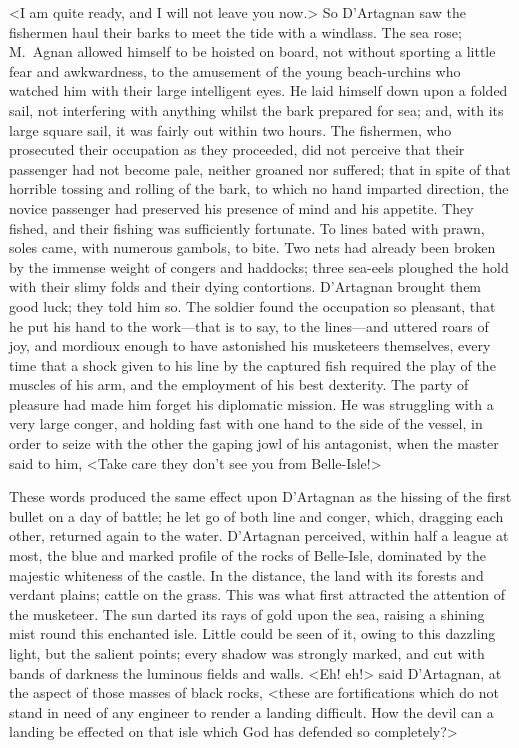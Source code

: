 <I am quite ready, and I will not leave you now.> So D'Artagnan saw the fishermen haul their barks to meet the tide with a windlass. The sea rose; M.~Agnan allowed himself to be hoisted on board, not without sporting a little fear and awkwardness, to the amusement of the young beach-urchins who watched him with their large intelligent eyes. He laid himself down upon a folded sail, not interfering with anything whilst the bark prepared for sea; and, with its large square sail, it was fairly out within two hours. The fishermen, who prosecuted their occupation as they proceeded, did not perceive that their passenger had not become pale, neither groaned nor suffered; that in spite of that horrible tossing and rolling of the bark, to which no hand imparted direction, the novice passenger had preserved his presence of mind and his appetite. They fished, and their fishing was sufficiently fortunate. To lines bated with prawn, soles came, with numerous gambols, to bite. Two nets had already been broken by the immense weight of congers and haddocks; three sea-eels ploughed the hold with their slimy folds and their dying contortions. D'Artagnan brought them good luck; they told him so. The soldier found the occupation so pleasant, that he put his hand to the work—that is to say, to the lines—and uttered roars of joy, and mordioux enough to have astonished his musketeers themselves, every time that a shock given to his line by the captured fish required the play of the muscles of his arm, and the employment of his best dexterity. The party of pleasure had made him forget his diplomatic mission. He was struggling with a very large conger, and holding fast with one hand to the side of the vessel, in order to seize with the other the gaping jowl of his antagonist, when the master said to him, <Take care they don't see you from Belle-Isle!>

These words produced the same effect upon D'Artagnan as the hissing of the first bullet on a day of battle; he let go of both line and conger, which, dragging each other, returned again to the water. D'Artagnan perceived, within half a league at most, the blue and marked profile of the rocks of Belle-Isle, dominated by the majestic whiteness of the castle. In the distance, the land with its forests and verdant plains; cattle on the grass. This was what first attracted the attention of the musketeer. The sun darted its rays of gold upon the sea, raising a shining mist round this enchanted isle. Little could be seen of it, owing to this dazzling light, but the salient points; every shadow was strongly marked, and cut with bands of darkness the luminous fields and walls. <Eh! eh!> said D'Artagnan, at the aspect of those masses of black rocks, <these are fortifications which do not stand in need of any engineer to render a landing difficult. How the devil can a landing be effected on that isle which God has defended so completely?>


